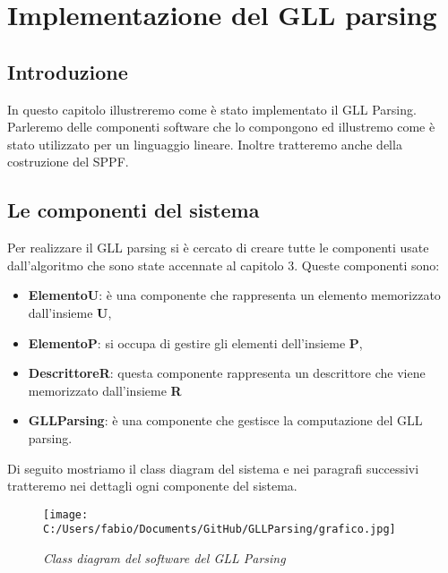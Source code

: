 \chapter{Implementazione del GLL parsing}
\section{Introduzione}
In questo capitolo illustreremo come è stato implementato il GLL Parsing. Parleremo delle componenti software che lo compongono ed illustremo come è stato utilizzato per un linguaggio lineare. Inoltre tratteremo anche della costruzione del SPPF.
\section{Le componenti del sistema}
Per realizzare il GLL parsing si è cercato di creare tutte le componenti usate dall'algoritmo che sono state accennate al capitolo 3. Queste componenti sono:
\begin{itemize}
	\item \textbf{ElementoU}: è una componente che rappresenta un elemento memorizzato dall'insieme \textbf{U},
	\item \textbf{ElementoP}: si occupa di gestire gli elementi dell'insieme \textbf{P},
	\item \textbf{DescrittoreR}: questa componente rappresenta un descrittore che viene memorizzato dall'insieme \textbf{R} 
	\item \textbf{GLLParsing}: è una componente che gestisce la computazione del GLL parsing.
\end{itemize}
Di seguito mostriamo il class diagram del sistema e nei paragrafi successivi tratteremo nei dettagli ogni componente del sistema.
\begin{figure}[h]
	\flushleft
	\texttt{[image: C:/Users/fabio/Documents/GitHub/GLLParsing/grafico.jpg]}
	\caption{\textit{Class diagram del software del GLL Parsing}}
\end{figure}
